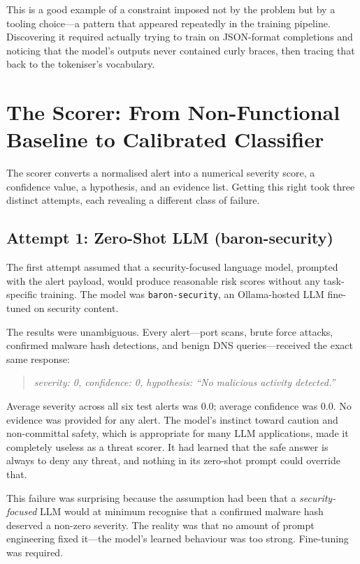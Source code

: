 This is a good example of a constraint imposed not by the problem but by a tooling choice---a pattern that appeared repeatedly in the training pipeline. Discovering it required actually trying to train on JSON-format completions and noticing that the model's outputs never contained curly braces, then tracing that back to the tokeniser's vocabulary.

\section{The Scorer: From Non-Functional Baseline to Calibrated Classifier}
\label{sec:scorer-training}

The scorer converts a normalised alert into a numerical severity score, a confidence value, a hypothesis, and an evidence list. Getting this right took three distinct attempts, each revealing a different class of failure.

\subsection{Attempt 1: Zero-Shot LLM (baron-security)}

The first attempt assumed that a security-focused language model, prompted with the alert payload, would produce reasonable risk scores without any task-specific training. The model was \texttt{baron-security}, an Ollama-hosted LLM fine-tuned on security content.

The results were unambiguous. Every alert---port scans, brute force attacks, confirmed malware hash detections, and benign DNS queries---received the exact same response:

\begin{quote}
\emph{severity: 0, confidence: 0, hypothesis: ``No malicious activity detected.''}
\end{quote}

Average severity across all six test alerts was 0.0; average confidence was 0.0. No evidence was provided for any alert. The model's instinct toward caution and non-committal safety, which is appropriate for many LLM applications, made it completely useless as a threat scorer. It had learned that the safe answer is always to deny any threat, and nothing in its zero-shot prompt could override that.

This failure was surprising because the assumption had been that a \emph{security-focused} LLM would at minimum recognise that a confirmed malware hash deserved a non-zero severity. The reality was that no amount of prompt engineering fixed it---the model's learned behaviour was too strong. Fine-tuning was required.

